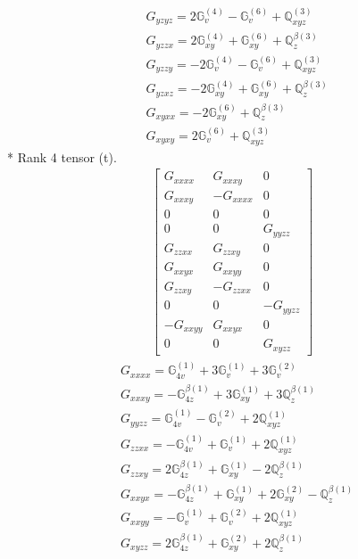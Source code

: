 \documentclass[fleqn,8pt,landscape]{jsarticle}
\begin{document}
\begin{align*}
& G_{yzyz} = 2 \mathbb{G}_{v}^{(4)} - \mathbb{G}_{v}^{(6)} + \mathbb{Q}_{xyz}^{(3)} \\
& G_{yzzx} = 2 \mathbb{G}_{xy}^{(4)} + \mathbb{G}_{xy}^{(6)} + \mathbb{Q}_{z}^{\beta(3)} \\
& G_{yzzy} = - 2 \mathbb{G}_{v}^{(4)} - \mathbb{G}_{v}^{(6)} + \mathbb{Q}_{xyz}^{(3)} \\
& G_{yzxz} = - 2 \mathbb{G}_{xy}^{(4)} + \mathbb{G}_{xy}^{(6)} + \mathbb{Q}_{z}^{\beta(3)} \\
& G_{xyxx} = - 2 \mathbb{G}_{xy}^{(6)} + \mathbb{Q}_{z}^{\beta(3)} \\
& G_{xyxy} = 2 \mathbb{G}_{v}^{(6)} + \mathbb{Q}_{xyz}^{(3)}
\end{align*}
* Rank 4 tensor (t).
\begin{align*}
\begin{bmatrix} G_{xxxx} & G_{xxxy} & 0 \\ G_{xxxy} & - G_{xxxx} & 0 \\ 0 & 0 & 0 \\ 0 & 0 & G_{yyzz} \\ G_{zzxx} & G_{zzxy} & 0 \\ G_{xxyx} & G_{xxyy} & 0 \\ G_{zzxy} & - G_{zzxx} & 0 \\ 0 & 0 & - G_{yyzz} \\ - G_{xxyy} & G_{xxyx} & 0 \\ 0 & 0 & G_{xyzz} \end{bmatrix}
\end{align*}
\begin{align*}
& G_{xxxx} = \mathbb{G}_{4v}^{(1)} + 3 \mathbb{G}_{v}^{(1)} + 3 \mathbb{G}_{v}^{(2)} \\
& G_{xxxy} = - \mathbb{G}_{4z}^{\beta(1)} + 3 \mathbb{G}_{xy}^{(1)} + 3 \mathbb{Q}_{z}^{\beta(1)} \\
& G_{yyzz} = \mathbb{G}_{4v}^{(1)} - \mathbb{G}_{v}^{(2)} + 2 \mathbb{Q}_{xyz}^{(1)} \\
& G_{zzxx} = - \mathbb{G}_{4v}^{(1)} + \mathbb{G}_{v}^{(1)} + 2 \mathbb{Q}_{xyz}^{(1)} \\
& G_{zzxy} = 2 \mathbb{G}_{4z}^{\beta(1)} + \mathbb{G}_{xy}^{(1)} - 2 \mathbb{Q}_{z}^{\beta(1)} \\
& G_{xxyx} = - \mathbb{G}_{4z}^{\beta(1)} + \mathbb{G}_{xy}^{(1)} + 2 \mathbb{G}_{xy}^{(2)} - \mathbb{Q}_{z}^{\beta(1)} \\
& G_{xxyy} = - \mathbb{G}_{v}^{(1)} + \mathbb{G}_{v}^{(2)} + 2 \mathbb{Q}_{xyz}^{(1)} \\
& G_{xyzz} = 2 \mathbb{G}_{4z}^{\beta(1)} + \mathbb{G}_{xy}^{(2)} + 2 \mathbb{Q}_{z}^{\beta(1)}
\end{align*}
\end{document}
